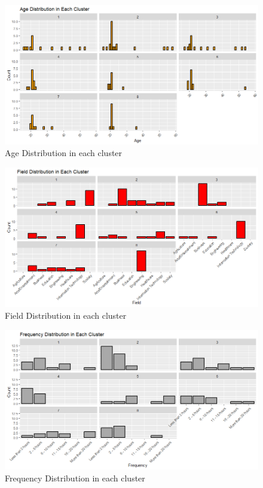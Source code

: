     \begin{figure}[H]
        \centering
        \includegraphics[scale=0.6]{graphics/dummy/distribution/AgeDistribution.png}
        \caption{Age Distribution in each cluster}
    \end{figure}

    \begin{figure}[H]
        \centering
        \includegraphics[scale=0.6]{graphics/dummy/distribution/FieldDistribution.png}
        \caption{Field Distribution in each cluster}
    \end{figure}

    \begin{figure}[H]
        \centering
        \includegraphics[scale=0.6]{graphics/dummy/distribution/FrequencyDistribution.png}
        \caption{Frequency Distribution in each cluster}
    \end{figure}

